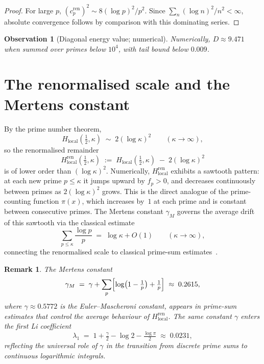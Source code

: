 \documentclass[11pt]{article}
\newtheorem{observation}[theorem]{Observation}
\newtheorem*{remark}{Remark}
\newcommand{\Hlocal}{H_{\mathrm{local}}}
\newcommand{\Hren}{H_{\mathrm{local}}^{\mathrm{ren}}}
\newcommand{\cren}{c_p^{\mathrm{ren}}}
\begin{document}
\begin{proof}
For large $p$, $(\cren)^2 \sim 8(\log p)^2/p^2$.
Since $\sum_n (\log n)^2/n^2 < \infty$, absolute convergence
follows by comparison with this dominating series.
\end{proof}

\begin{observation}[Diagonal energy value; numerical]\label{obs:D-value}
Numerically, $D\approx 9.471$ when summed over primes below
$10^4$, with tail bound below $0.009$.
\end{observation}

\section{The renormalised scale and the Mertens constant}
\label{sec:scale}

By the prime number theorem,
\[
\Hlocal(\tfrac12,\kappa) \;\sim\; 2(\log\kappa)^2
\qquad (\kappa\to\infty),
\]
so the renormalised remainder
\[
\Hren(\tfrac12,\kappa) \;:=\;
\Hlocal(\tfrac12,\kappa) \;-\; 2(\log\kappa)^2
\]
is of lower order than $(\log\kappa)^2$.
Numerically, $\Hren$ exhibits a sawtooth pattern: at each new
prime $p\le\kappa$ it jumps upward by $f_p>0$, and decreases
continuously between primes as $2(\log\kappa)^2$ grows.
This is the direct analogue of the prime-counting function
$\pi(x)$, which increases by~$1$ at each prime and is constant
between consecutive primes.
The Mertens constant $\gamma_M$ governs the average drift of
this sawtooth via the classical estimate
\[
\sum_{p\le\kappa}\frac{\log p}{p} \;=\; \log\kappa + O(1)
\qquad (\kappa\to\infty),
\]
connecting the renormalised scale to classical prime-sum
estimates~\cite{Mertens}.

\begin{remark}
The Mertens constant
\[
\gamma_M \;=\; \gamma + \sum_p\Bigl[\log\bigl(1-\tfrac1p\bigr)+\tfrac1p\Bigr]
\;\approx\; 0.2615,
\]
where $\gamma\approx 0.5772$ is the Euler--Mascheroni constant,
appears in prime-sum estimates that control the average
behaviour of $\Hren$.
The same constant $\gamma$ enters the first Li
coefficient~\cite{Li}
\[
\lambda_1 \;=\; 1 + \tfrac{\gamma}{2} - \log 2
- \tfrac{\log\pi}{2} \;\approx\; 0.0231,
\]
reflecting the universal role of $\gamma$ in the transition
from discrete prime sums to continuous logarithmic integrals.
\end{remark}
\end{document}
